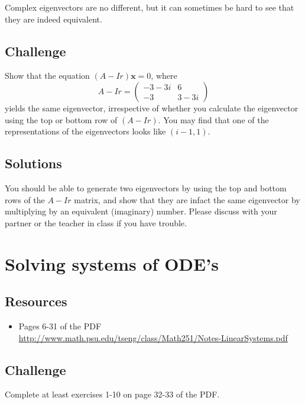 Complex eigenvectors are no different, but it can sometimes be hard to see that they are indeed equivalent.

\subsection*{Challenge}
Show that the equation $(A - Ir)\bm{x} = {0}$, where
\begin{equation}
     A-Ir = \left(
        \begin{array}{cc}
            -3 -3i & 6 \\
            -3 & 3-3i
        \end{array}
    \right)
\end{equation}
yields the same eigenvector, irrespective of whether you calculate the eigenvector using the top or bottom row of $(A-Ir)$. You may find that one of the representations of the eigenvectors looks like $(i-1,1)$.

\subsection*{Solutions}
You should be able to generate two eigenvectors by using the top and bottom rows of the $A-Ir$ matrix, and show that they are infact the same eigenvector by multiplying by an equivalent (imaginary) number. Please discuss with your partner or the teacher in class if you have trouble.



\newpage
\section{Solving systems of ODE's}
\label{sec:systemsolving}

\subsection*{Resources}
\begin{itemize}
    \item Pages 6-31 of the PDF \url{http://www.math.psu.edu/tseng/class/Math251/Notes-LinearSystems.pdf} 
\end{itemize}

\subsection*{Challenge}
Complete at least exercises 1-10 on page 32-33 of the PDF.

